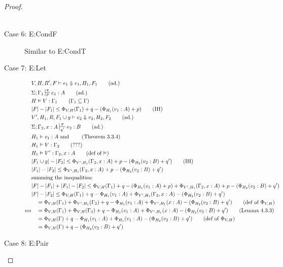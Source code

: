 \documentclass[11pt]{article}
\begin{document}
\begin{proof}
\begin{description}
\begin{align*}
  \end{align*}
  \item[Case 6: E:CondF] 
  Similar to E:CondT
  \item[Case 7: E:Let]
  \begin{align*}
  &V,H,R',F \vdash e_1 \Downarrow v_1,H_1,F_1 \tag{ad.}\\
  &\Sigma; \Gamma_1 \sststile{p}{q} e_1 : A \tag{ad.}\\
  &H \vDash V : \Gamma_1 \tag{$\Gamma_1 \subseteq \Gamma$}\\
  &|F| - |F_1| \le \Phi_{V,H}(\Gamma_1) +q - (\Phi_{H_1}(v_1:A) + p) \tag{IH}\\
  &V',H_1,R, F_1 \cup g \vdash e_2 \Downarrow v_2,H_2,F_2 \tag{ad.}\\
  &\Sigma; \Gamma_2, x : A \sststile{q'}{p} e_2 : B \tag{ad.}\\
  &H_1 \vDash v_1 : A \text{ and } \tag{Theorem 3.3.4}\\ 
  &H_1 \vDash V : \Gamma_2 \tag{???}\\
  &H_1 \vDash V' : \Gamma_2, x : A \tag{def of $\vDash$}\\
  &|F_1 \cup g| - |F_2| \le  \Phi_{V',H_1}(\Gamma_2, x:A) +p - (\Phi_{H_2}(v_2:B) + q') \tag{IH}\\
  &|F_1| - |F_2| \le \Phi_{V',H_1}(\Gamma_2,x:A) + p - (\Phi_{H_2}(v_2:B) + q')\\
  &\text{summing the inequalities:}\\
  &|F| - |F_1| + |F_1| - |F_2| \le \Phi_{V,H}(\Gamma_1) +q - (\Phi_{H_1}(v_1:A) + p) + \Phi_{V',H_1}(\Gamma_2,x:A) + p - (\Phi_{H_2}(v_2:B) + q')\\
  &|F| - |F_2| \le \Phi_{V,H}(\Gamma_1) +q - \Phi_{H_1}(v_1:A) + \Phi_{V',H_1}(\Gamma_2,x:A) - (\Phi_{H_2}(v_2:B) + q')\\
  &\quad = \Phi_{V,H}(\Gamma_1) + \Phi_{V',H_1}(\Gamma_2) + q - \Phi_{H_1}(v_1:A) + \Phi_{V',H_1}(x:A) - (\Phi_{H_2}(v_2:B) + q') \tag{def of $\Phi_{V,H}$}\\nn 
  &\quad = \Phi_{V,H}(\Gamma_1) + \Phi_{V,H}(\Gamma_2) + q - \Phi_{H_1}(v_1:A) + \Phi_{V',H_1}(x:A) - (\Phi_{H_2}(v_2:B) + q') \tag{Lemma 4.3.3}\\
  &\quad = \Phi_{V,H}(\Gamma) + q - \Phi_{H_1}(v_1:A) + \Phi_{H_1}(v_1:A) - (\Phi_{H_2}(v_2:B) + q') \tag{def of $\Phi_{V,H}$}\\
  &\quad = \Phi_{V,H}(\Gamma) + q - (\Phi_{H_2}(v_2:B) + q') \\
  \end{align*}
  \item[Case 8: E:Pair]

\end{description}
\end{proof}
\end{document}
